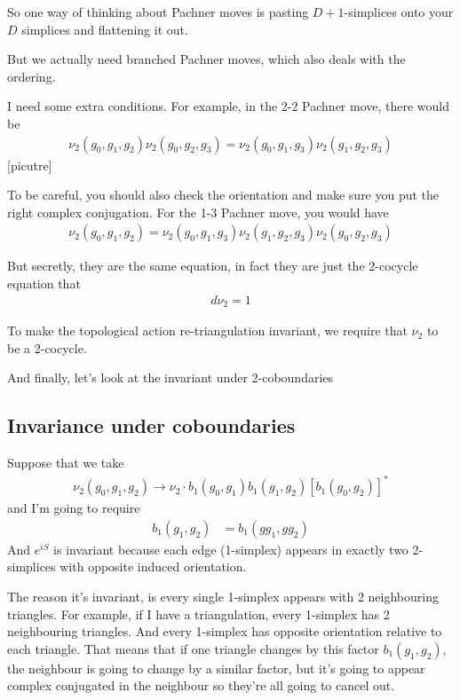 So one way of thinking about Pachner moves is pasting $D+1$-simplices onto your
$D$ simplices and flattening it out.


But we actually need branched Pachner moves,
which also deals with the ordering.

I need some extra conditions.
For example,
in the 2-2 Pachner move,
there would be
\begin{align}
    \nu_2 (g_0, g_1, g_2)
    \nu_2 (g_0, g_2, g_3)
    =
    \nu_2 (g_0, g_1, g_3)
    \nu_2 (g_1, g_2, g_3)
\end{align}
[picutre]

To be careful,
you should also check the orientation and make sure you put the right complex
conjugation.
For the 1-3 Pachner move,
you would have
\begin{align}
    \nu_2(g_0, g_1, g_2) =
    \nu_2(g_0, g_1, g_3)
    \nu_2(g_1, g_2, g_3)
    \nu_2(g_0, g_2, g_3)
\end{align}

But secretly,
they are the same equation,
in fact they are just the 2-cocycle equation that
\begin{align}
    d\nu_2 = 1
\end{align}

To make the topological action re-triangulation invariant,
we require that $\nu_2$ to be a 2-cocycle.

And finally,
let's look at the invariant under 2-coboundaries

\subsection{Invariance under coboundaries}
Suppose that we take
\begin{align}
    \nu_2 (g_0, g_1, g_2)
    \to
    \nu_2 \cdot 
    b_1 (g_0, g_1)
    b_1 (g_1, g_2)
    \left[ b_1 (g_0, g_2) \right]^*
\end{align}
and I'm going to require
\begin{align}
    b_1 (g_1, g_2) &= b_1 (gg_1, gg_2)
\end{align}
And $e^{iS}$ is invariant because each edge (1-simplex) appears in exactly two
2-simplices with opposite induced orientation.

The reason it's invariant, is every single 1-simplex appears with 2 neighbouring
triangles.
For example, if I have a triangulation,
every 1-simplex has 2 neighbouring triangles.
And every 1-simplex has opposite orientation relative to each triangle.
That means that if one triangle changes by this factor $b_1(g_1,g_2)$,
the neighbour is going to change by a similar factor,
but it's going to appear complex conjugated in the neighbour so they're all
going to cancel out.

